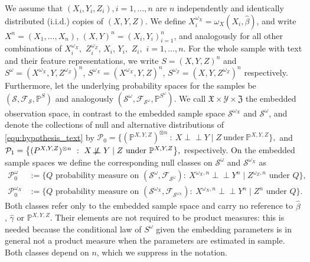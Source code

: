 \documentclass[twoside,11pt]{article}
\newcommand{\indep}{\perp \!\!\! \perp}
\newcommand{\notindep}{\not\!\perp\!\!\!\perp}
\begin{document}
We assume that $(X_i,Y_i, Z_i), i=1,\hdots,n$ are $n$ independently and identically distributed (i.i.d.) copies of $(X,Y,Z)$. We define $X^{\omega_X}_i=\omega_X(X_i,\hat{\beta})$, and write $X^n=(X_1,\hdots,X_n)$, $(X,Y)^n=(X_i,Y_i)_{i=1}^n$, and analogously for all other combinations of $X_i^{\omega_X},$ $Z_i^{\omega_Z}$, $X_i$, $Y_i,$ $Z_i,$ $i=1,\hdots,n$.  
For the whole sample with text and their feature representations, we write $S=(X, Y, Z)^n$ and $S^\omega=(X^{\omega_X}, Y,Z^{\omega_Z})^n$, $S^{\omega_X}=(X^{\omega_X}, Y,Z)^n$, $S^{\omega_Z}=(X, Y,Z^{\omega_Z})^n$ respectively. 
Furthermore, let the underlying probability spaces for the samples be $(\mathcal{S}, \mathcal{F}_\mathcal{S}, \mathbb{P}^S)$ and analogously $(\mathcal{S}^\omega, \mathcal{F}_{\mathcal{S}^\omega}, \mathbb{P}^{S^\omega})$.
We call $\mathfrak X\times\mathcal Y\times\mathfrak Z$ the embedded observation space, in contrast to the embedded sample space $\mathcal S^{\omega_X}$ and $\mathcal S^\omega$, and denote the collections of null and alternative distributions of \eqref{equ:hypothesis_text}
by $
  \mathcal P_0=\big\{(\mathbb P^{X,Y,Z})^{\otimes n}\ :\ X\indep Y\mid Z\ \text{under}\ \mathbb{P}^{X,Y,Z}\big\},$ and $\mathcal P_1=\big\{\mathbb (P^{X,Y,Z})^{\otimes n}\ :\ X\notindep Y\mid Z\ \text{under}\ \mathbb{P}^{X,Y,Z}\big\},
$
respectively. 
On the embedded sample spaces we define the corresponding null classes on $\mathcal{S}^\omega $ and $\mathcal{S}^{\omega_X} $ as 
\begin{align}
\mathcal{P}^\omega_0 &:= \bigl\{Q \text{ probability measure on }
 (\mathcal{S}^\omega,\mathcal{F}_{\mathcal{S}^\omega}) :\
 X^{\omega_X,n}\indep Y^n \mid Z^{\omega_Z,n} \text{ under } Q \bigr\},
 \label{eq:P0omega}
 \\
\mathcal{P}^{\omega_X}_0 &:= \bigl\{Q \text{ probability measure on }
 (\mathcal{S}^{\omega_X},\mathcal{F}_{\mathcal{S}^{\omega_X}}) :\
 X^{\omega_X,n}\indep Y^n \mid Z^{n} \text{ under } Q \bigr\}.
 \label{eq:P0omegaX}
\end{align}
Both classes refer only to the embedded sample space and carry no reference to $\hat\beta$, $\hat\gamma$ or $\mathbb{P}^{X,Y,Z}$. 
Their elements are not required to be product measures: this is needed because the conditional law of $S^\omega$ given the embedding parameters is in general not a product measure when the parameters are estimated in sample. 
Both classes depend on $n$, which we suppress in the notation.
\end{document}
